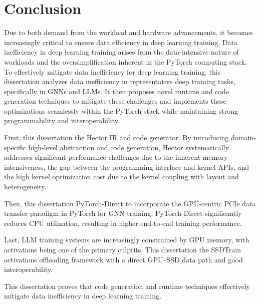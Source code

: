 \chapter{Conclusion}\label{ch:conclusion}

Due to both demand from the workload and hardware advancements, it becomes increasingly critical to ensure data efficiency in deep learning training. 
Data inefficiency in deep learning training arises from the data-intensive nature of workloads and the oversimplification inherent in the PyTorch computing stack.
To effectively mitigate data inefficiency for deep learning training, this dissertation analyzes data inefficiency in representative deep training tasks, specifically in GNNs and LLMs. It then proposes novel runtime and code generation techniques to mitigate these challenges and implements these optimizations seamlessly within the PyTorch stack while maintaining strong programmability and interoperability.

First, this dissertation  the Hector IR and code generator. By introducing domain-specific high-level abstraction and code generation, Hector systematically addresses significant performance challenges due to the inherent memory intensiveness, the gap between the programming interface and kernel APIs, and the high kernel optimization cost due to the kernel coupling with layout and heterogeneity.

Then, this dissertation  PyTorch-Direct to incorporate the GPU-centric PCIe data transfer paradigm in PyTorch for GNN training. PyTorch-Direct significantly reduces CPU utilization, resulting in higher end-to-end training performance.

Last, LLM training systems are increasingly constrained by GPU memory, with activations being one of the primary culprits. This dissertation  the SSDTrain activations offloading framework with a direct GPU–SSD data path and good interoperability.

This dissertation proves that code generation and runtime techniques  effectively mitigate data inefficiency in deep learning training.


